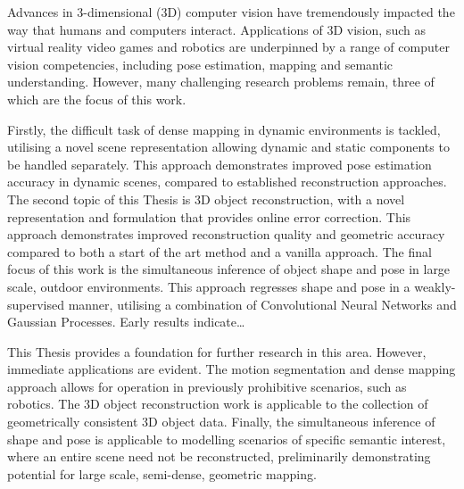 Advances in 3-dimensional (3D) computer vision have tremendously impacted the way that humans and computers interact. 
Applications of 3D vision, such as virtual reality video games and robotics are underpinned by a range of 
computer vision competencies, including pose estimation, mapping and semantic understanding. However, 
many challenging research problems remain, three of which are the focus of this work.

Firstly, the difficult task of dense mapping in dynamic environments is tackled, utilising a 
novel scene representation allowing dynamic and static components to be handled separately. This approach demonstrates improved 
pose estimation accuracy in dynamic scenes, compared to established reconstruction approaches. The second topic of this Thesis is 3D object reconstruction, with a novel representation and formulation that provides 
online error correction. This approach demonstrates improved reconstruction quality and geometric accuracy compared to both 
a start of the art method and a vanilla approach. The final focus of this work is the simultaneous inference of object shape and pose in large scale, outdoor environments. 
This approach regresses shape and pose in a weakly-supervised manner, utilising a combination of Convolutional Neural Networks 
and Gaussian Processes. Early results indicate\dots

This Thesis provides a foundation for further research in this area. However, immediate applications are evident. The motion segmentation and dense mapping approach allows for operation 
in previously prohibitive scenarios, such as robotics. The 3D object reconstruction work is applicable to the collection of 
geometrically consistent 3D object data. Finally, the simultaneous inference of shape and pose is applicable to modelling scenarios of 
specific semantic interest, where an entire scene need not be reconstructed, preliminarily demonstrating potential for large 
scale, semi-dense, geometric mapping.